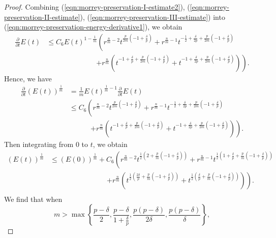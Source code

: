 \documentclass[12pt]{amsart}
\theoremstyle{plain}
\theoremstyle{plain}
\theoremstyle{definition}
\theoremstyle{remark}
\numberwithin{equation}{subsection}
\begin{document}
\begin{proof}
    Combining (\ref{eqn:morrey-preservation-I-estimate2}), (\ref{eqn:morrey-preservation-II-estimate}), (\ref{eqn:morrey-preservation-III-estimate}) into (\ref{eqn:morrey-preservation-energy-derivative1}), we obtain
    \begin{align*}
        \frac{\partial}{\partial t} E(t) &\leq C_6E(t)^{1-\frac{1}{m}}\left(r^{\frac{n}{m}-2}t^{\frac{p}{2m}\left(-1+\frac{\delta}{p}\right)} + r^{\frac{n}{m}-1}t^{-\frac{1}{2}+\frac{\delta}{2p}+\frac{p}{2m}\left(-1+\frac{\delta}{p}\right)} \right. \nonumber \\
        &\qquad\qquad\qquad\quad \left. + r^{\frac{n}{m}}\left(t^{-1+\frac{\delta}{p}+\frac{p}{2m}\left(-1+\frac{\delta}{p}\right)} + t^{-1+\frac{\delta}{2p}+\frac{p}{2m}\left(-1+\frac{\delta}{p}\right)}\right)\right).
    \end{align*}
    Hence, we have
    \begin{align*}
        \frac{\partial}{\partial t}\left(E(t)\right)^{\frac{1}{m}} &= \frac{1}{m}E(t)^{\frac{1}{m}-1}\frac{\partial}{\partial t}E(t) \nonumber \\
        &\leq C_6\left(r^{\frac{n}{m}-2}t^{\frac{p}{2m}\left(-1+\frac{\delta}{p}\right)} + r^{\frac{n}{m}-1}t^{-\frac{1}{2}+\frac{\delta}{2p}+\frac{p}{2m}\left(-1+\frac{\delta}{p}\right)} \right. \nonumber \\
        &\qquad\quad \left. + r^{\frac{n}{m}}\left(t^{-1+\frac{\delta}{p}+\frac{p}{2m}\left(-1+\frac{\delta}{p}\right)} + t^{-1+\frac{\delta}{2p}+\frac{p}{2m}\left(-1+\frac{\delta}{p}\right)}\right)\right).
    \end{align*}
    Then integrating from $0$ to $t$, we obtain
    \begin{align*}
        \left(E(t)\right)^{\frac{1}{m}} &\leq \left(E(0)\right)^\frac{1}{m} + C_6\left(r^{\frac{n}{m}-2}t^{\frac{1}{2}\left(2+\frac{p}{m}\left(-1+\frac{\delta}{p}\right)\right)} + r^{\frac{n}{m}-1}t^{\frac{1}{2}\left(1+\frac{\delta}{p}+\frac{p}{m}\left(-1+\frac{\delta}{p}\right)\right)} \right. \nonumber \\
        &\qquad\qquad\qquad\qquad \left. + r^{\frac{n}{m}}\left(t^{\frac{1}{2}\left(\frac{2\delta}{p}+\frac{p}{m}\left(-1+\frac{\delta}{p}\right)\right)} + t^{\frac{1}{2}\left(\frac{\delta}{p}+\frac{p}{m}\left(-1+\frac{\delta}{p}\right)\right)}\right)\right). \nonumber \\
    \end{align*}
    We find that when
    \begin{equation*}
        m > \max\left\{\frac{p-\delta}{2},\frac{p-\delta}{1+\frac{\delta}{p}},\frac{p(p-\delta)}{2\delta},\frac{p(p-\delta)}{\delta}\right\},

\end{equation*}
\end{proof}
\end{document}
